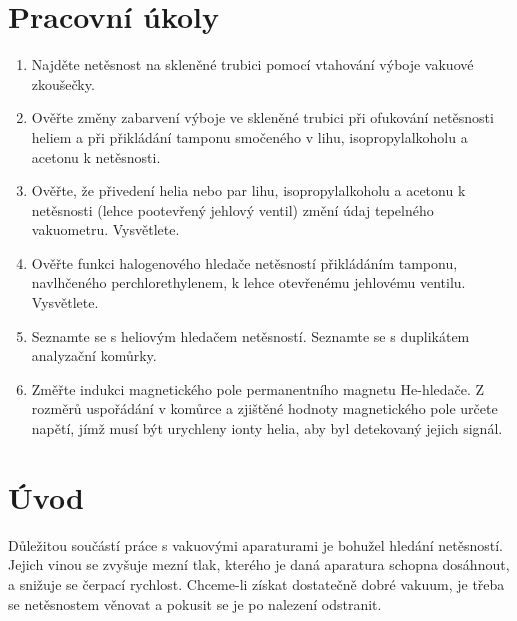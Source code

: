\documentclass[english]{article}
\begin{document}


\setlength{\parindent}{0.5cm}

\section{Pracovní úkoly}
\begin{enumerate}
	\item Najděte netěsnost na skleněné trubici pomocí vtahování výboje vakuové zkoušečky.
	\item Ověřte změny zabarvení výboje ve skleněné trubici při ofukování netěsnosti heliem a při přikládání tamponu smočeného v lihu, isopropylalkoholu a acetonu k netěsnosti.
	\item Ověřte, že přivedení helia nebo par lihu, isopropylalkoholu a acetonu k netěsnosti (lehce pootevřený jehlový ventil) změní údaj tepelného vakuometru. Vysvětlete.
	\item Ověřte funkci halogenového hledače netěsností přikládáním tamponu, navlhčeného perchlorethylenem, k lehce otevřenému jehlovému ventilu. Vysvětlete.
	\item Seznamte se s heliovým hledačem netěsností. Seznamte se s duplikátem analyzační komůrky.
	\item Změřte indukci magnetického pole permanentního magnetu He-hledače. Z rozměrů uspořádání v komůrce a zjištěné hodnoty magnetického pole určete napětí, jímž musí být urychleny ionty helia, aby byl detekovaný jejich signál.
\end{enumerate}

\section{Úvod}
	Důležitou součástí práce s vakuovými aparaturami je bohužel hledání netěsností. Jejich vinou se zvyšuje mezní tlak, kterého je daná aparatura schopna dosáhnout, a snižuje se čerpací rychlost. Chceme-li získat dostatečně dobré vakuum, je třeba se netěsnostem věnovat a pokusit se je po nalezení odstranit.

\end{document}
